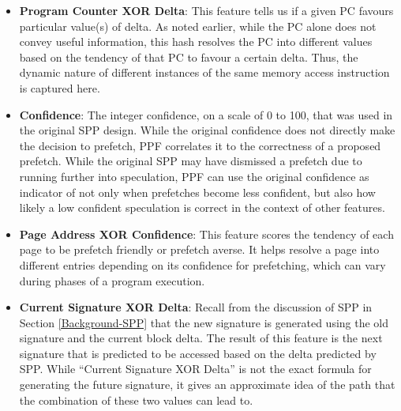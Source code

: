 \begin{itemize}
\item \textbf{Program Counter XOR Delta}: This feature tells us if a
  given PC favours particular value(s) of delta.  As noted earlier,
  while the PC alone does not convey useful information, this
  hash resolves the PC into different values based on the tendency of
  that PC to favour a certain delta.  Thus, the dynamic nature of
  different instances of the same memory access instruction is 
  captured here.

\item \textbf{Confidence}: The integer confidence, on a scale of 0 to
  100, that was used in the original SPP design. While the original 
  confidence does not directly make the decision to prefetch,
  PPF correlates it to the correctness of a proposed prefetch.
  While the original SPP may have dismissed a prefetch due to running
  further into speculation, PPF can use the original confidence as indicator
  of not only when prefetches become less confident, but also how likely
  a low confident speculation is correct in the context of other features.

\item \textbf{Page Address XOR Confidence}: This feature scores the
  tendency of each page to be prefetch friendly or prefetch averse. It
  helps resolve a page into different entries depending on its
  confidence for prefetching, which can vary during phases of a
  program execution.

\item \textbf{Current Signature XOR Delta}: Recall from the discussion
  of SPP in Section \ref{Background-SPP} that the new signature is
  generated using the old signature and the current block delta.
  The result of this feature is the next signature that is predicted to be
  accessed based on the delta predicted by SPP. While ``Current
  Signature XOR Delta'' is not the exact formula for generating the
  future signature, it gives an approximate idea of the path that the
  combination of these two values can lead to.



\end{itemize}
